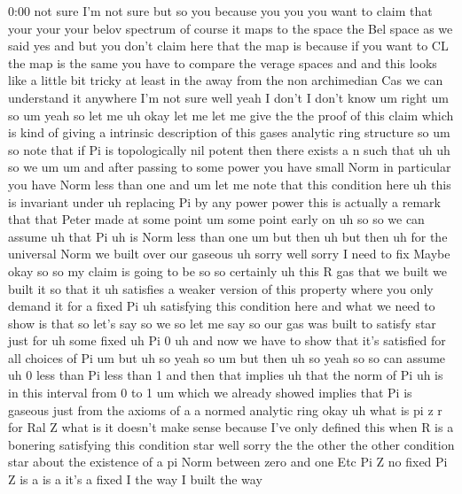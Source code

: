\begin{unfinished}{0:00}
not  sure  I'm  not  sure  but  so  you  because
you  you  you  want  to  claim  that  your  your
your  belov  spectrum  of  course  it  maps  to
the  space  the  Bel  space  as  we  said  yes
and  but  you  don't  claim  here  that  the
map  is  because  if  you  want  to  CL  the  map
is  the  same  you  have  to  compare  the
verage  spaces  and  and  this  looks  like  a
little  bit  tricky  at  least  in  the  away
from  the  non  archimedian  Cas  we  can
understand
it  anywhere  I'm  not  sure  well  yeah  I
don't  I  don't  know  um  right
um  so
um  yeah  so  let  me  uh  okay  let  me  let  me
give  the  the  proof  of  this  claim  which
is  kind  of  giving  a  intrinsic
description  of  this  gases  analytic  ring
structure  so  um  so  note  that  if  Pi  is
topologically  nil
potent  then
there  exists  a  n  such  that
uh  uh  so  we
um  um  and  after  passing  to  some  power
you  have  small  Norm  in  particular  you
have  Norm  less  than  one  and
um  let  me  note  that  this  condition  here
uh  this  is  invariant
under  uh  replacing  Pi  by  any  power  power
this  is  actually  a  remark  that  that
Peter  made  at  some
point  um  some  point  early
on  uh  so  so  we  can  assume  uh  that
Pi  uh  is  Norm  less  than  one
um  but  then  uh  but  then  uh  for  the
universal  Norm  we  built  over  our  gaseous
uh  sorry  well  sorry  I  need  to  fix  Maybe
okay
so  so  my  claim  is  going  to  be  so  so
certainly  uh  this  R  gas  that  we  built  we
built  it  so  that  it  uh  satisfies  a
weaker  version  of  this  property  where
you  only  demand  it  for  a  fixed  Pi  uh
satisfying  this  condition  here  and  what
we  need  to  show  is  that  so  let's  say  so
we  so  let  me  say  so  our  gas  was
built  to
satisfy  star  just  for  uh  some  fixed  uh
Pi
0  uh  and  now  we  have  to  show  that  it's
satisfied  for  all  choices  of  Pi  um  but
uh  so  yeah
so  um  but  then  uh  so  yeah  so  so  can
assume
uh  0  less  than  Pi  less  than  1  and  then
that  implies  uh  that  the  norm  of  Pi  uh
is  in  this  interval  from  0  to  1  um  which
we  already  showed  implies  that  Pi  is
gaseous  just  from  the  axioms  of  a  a
normed  analytic
ring
okay
uh  what  is  pi  z  r  for  Ral  Z  what  is
it  doesn't  make  sense  because  I've  only
defined  this  when  R  is  a  bonering
satisfying  this  condition  star  well
sorry  the  the  other  the  other  condition
star  about  the  existence  of  a  pi  Norm
between  zero  and  one  Etc  Pi  Z  no  fixed
Pi  Z  is  a  is
a  it's  a  fixed  I  the  way  I  built  the  way

\end{unfinished}
